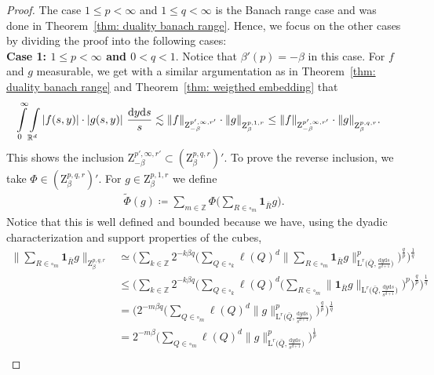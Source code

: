 \documentclass[11pt, leqno,parskip=half]{amsart}
\theoremstyle{definition}
\newcommand{\IR}{\mathbb{R}}
\newcommand{\IZ}{\mathbb{Z}}
\renewcommand{\L}{\mathrm{L}}
\newcommand{\Z}{\mathrm{Z}}
\renewcommand{\d}{\mathrm{d}}
\numberwithin{equation}{section}
\begin{document}
\begin{proof}
    The case $1\leq p<\infty$ and $1\leq q<\infty$ is the Banach range case and was done in Theorem~\ref{thm: duality banach range}. Hence, we focus on the other cases by dividing the proof into the following cases:\\

    \noindent \textbf{Case 1: $1\leq p<\infty$ and $0< q<1$}. Notice that $\beta'(p)=-\beta$ in this case. For $f$ and $g$ measurable,
    we get with a similar argumentation as in Theorem~\ref{thm: duality banach range} and Theorem~\ref{thm: weigthed embedding} that
    \begin{align*}
        \int\limits_0^\infty \int\limits_{\IR^d} |f(s,y)|\cdot |g(s,y)| \ \frac{\d y \d s }{s} &\lesssim  \|f\|_{\Z^{p', \infty,r'}_{-\beta}}\cdot\|g\|_{\Z^{\vphantom{p',q',r'}p,1,r}_\beta} \leq \|f\|_{\Z^{p', \infty,r'}_{-\beta}}\cdot \|g\|_{\Z^{\vphantom{p',q',r'}p,q,r}_\beta} .
    \end{align*}
    This shows the inclusion $\Z^{p', \infty,r'}_{-\beta}\subset (\Z^{p,q,r}_\beta)'$. To prove the reverse inclusion, we take $\Phi \in (\Z^{p,q,r}_\beta)'$. For $g\in \Z^{p,1,r}_\beta$ we define
    \begin{align*}
        \tilde \Phi (g) \coloneqq \sum\limits_{m\in\IZ} \Phi\Big(\sum\limits_{R\in\square_m} \mathbf{1}_{\bar R}g \Big).
    \end{align*}
    Notice that this is well defined and bounded because we have, using the dyadic characterization and support properties of the cubes,
    \begin{align*}
        \Big\|\sum\limits_{R\in\square_m} \mathbf{1}_{\bar R}g  \Big\|_{\Z^{p,q,r}_\beta} &\simeq \Big( \sum\limits_{k\in\IZ}2^{-k\beta q} \Big(\sum\limits_{Q\in\square_k} \ell(Q)^d \Big\|\sum\limits_{R\in\square_m} \mathbf{1}_{\bar R}g\Big\|_{\L^r\big(\bar Q, \frac{\d y \d s}{s^{d+1}}\big)}^p\Big)^\frac{q}{p}\Big)^\frac{1}{q}\\
        &\leq\Big( \sum\limits_{k\in\IZ}2^{-k\beta q} \Big(\sum\limits_{Q\in\square_k} \ell(Q)^d \Big(\sum\limits_{R\in\square_m} \|\mathbf{1}_{\bar R}g\|_{\L^r\big(\bar Q, \frac{\d y \d s}{s^{d+1}}\big)}\Big)^p\Big)^\frac{q}{p}\Big)^\frac{1}{q}\\
        &=\Big(2^{-m\beta q} \Big(\sum\limits_{Q\in\square_m} \ell(Q)^d \|g\|_{\L^r\big(\bar Q, \frac{\d y \d s}{s^{d+1}}\big)}^p\Big)^\frac{q}{p}\Big)^\frac{1}{q}\\
        &=2^{-m\beta } \Big(\sum\limits_{Q\in\square_m} \ell(Q)^d \|g\|_{\L^r\big(\bar Q, \frac{\d y \d s}{s^{d+1}}\big)}^p\Big)^\frac{1}{p}\\

\end{align*}
\end{proof}
\end{document}
